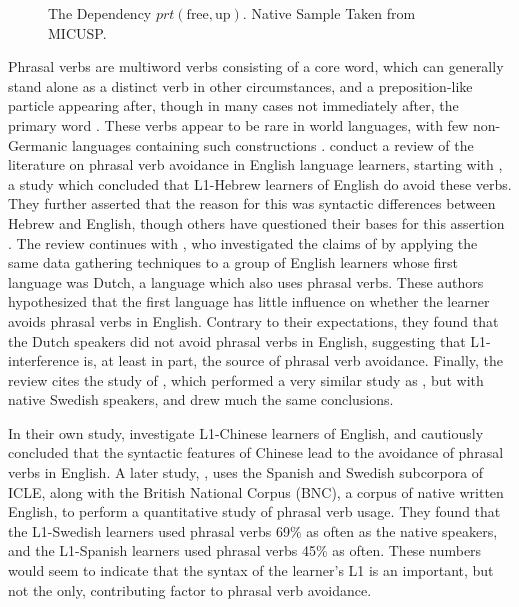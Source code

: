 \documentclass[main.tex]{subfiles}
\begin{document}
\begin{figure}[h]
\centering
{}
\caption[The Dependency $prt(\text{free},\text{up})$]{The Dependency $prt(\text{free},\text{up})$. Native Sample Taken from MICUSP.}
\label{ex:prt-en1}
\end{figure}

Phrasal verbs are multiword verbs consisting of a core word, which can generally stand alone as a distinct verb in other circumstances, and a preposition-like particle appearing after, though in many cases not immediately after, the primary word \citep{celce-murcia:1999}. These verbs appear to be rare in world languages, with few non-Germanic languages containing such constructions \citep{celce-murcia:1999}. \citet{liao:2004} conduct a review of the literature on phrasal verb avoidance in English language learners, starting with \citet{dagut:1985}, a study which concluded that L1-Hebrew learners of English do avoid these verbs. They further asserted that the reason for this was syntactic differences between Hebrew and English, though others have questioned their bases for this assertion \citep{liao:2004}. The review continues with \citet{hulstijn:1989}, who investigated the claims of \citeauthor{dagut:1985} by applying the same data gathering techniques to a group of English learners whose first language was Dutch, a language which also uses phrasal verbs. These authors hypothesized that the first language has little influence on whether the learner avoids phrasal verbs in English.  Contrary to their expectations, they found that the Dutch speakers did not avoid phrasal verbs in English, suggesting that L1-interference is, at least in part, the source of phrasal verb avoidance. Finally, the review cites the study of \citet{laufer:1993}, which performed a very similar study as \citeauthor{hulstijn:1989}, but with native Swedish speakers, and drew much the same conclusions.

In their own study, \citeauthor{liao:2004} investigate L1-Chinese learners of English, and cautiously concluded that the syntactic features of Chinese lead to the avoidance of phrasal verbs in English. A later study, \citet{gonzalez:2010}, uses the Spanish and Swedish subcorpora of ICLE, along with the British National Corpus (BNC), a corpus of native written English, to perform a quantitative study of phrasal verb usage. They found that the L1-Swedish learners used phrasal verbs 69\% as often as the native speakers, and the L1-Spanish learners used phrasal verbs 45\% as often. These numbers would seem to indicate that the syntax of the learner's L1 is an important, but not the only, contributing factor to phrasal verb avoidance.
\end{document}
